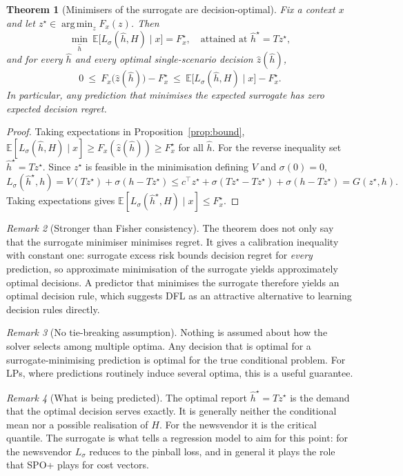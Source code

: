 \documentclass[11pt,a4paper]{article}
\newtheorem{theorem}{Theorem}
\theoremstyle{remark}
\newtheorem{remark}[theorem]{Remark}
\newcommand{\E}{\mathbb E}
\newcommand{\hh}{\hat h}
\newcommand{\Ls}{L_\sigma}
\DeclareMathOperator*{\argmin}{arg\,min}
\begin{document}
\begin{theorem}[Minimisers of the surrogate are decision-optimal]\label{thm:main}
Fix a context $x$ and let $z^\star\in\argmin_{z}F_x(z)$. Then
\[
 \min_{\hh}\ \E\bigl[\Ls(\hh,H)\mid x\bigr]=F_x^\star,
 \quad\text{attained at }\hh^\star=Tz^\star,
\]
and for every $\hh$ and every optimal single-scenario decision $\hat z(\hh)$,
\[
 0\ \le\ F_x\bigl(\hat z(\hh)\bigr)-F_x^\star\ \le\
 \E\bigl[\Ls(\hh,H)\mid x\bigr]-F_x^\star .
\]
In particular, any prediction that minimises the expected surrogate has zero
expected decision regret.
\end{theorem}

\begin{proof}
Taking expectations in Proposition~\ref{prop:bound},
$\E[\Ls(\hh,H)\mid x]\ge F_x(\hat z(\hh))\ge F_x^\star$ for all $\hh$. For the
reverse inequality set $\hh^\star=Tz^\star$. Since $z^\star$ is feasible in the
minimisation defining $V$ and $\sigma(0)=0$,
\[
 \Ls(\hh^\star,h)=V(Tz^\star)+\sigma(h-Tz^\star)
 \le c^\top z^\star+\sigma(Tz^\star-Tz^\star)+\sigma(h-Tz^\star)=G(z^\star,h).
\]
Taking expectations gives $\E[\Ls(\hh^\star,H)\mid x]\le F_x^\star$.
\end{proof}

\begin{remark}[Stronger than Fisher consistency]
The theorem does not only say that the surrogate minimiser minimises regret.
It gives a calibration inequality with constant one: surrogate excess risk
bounds decision regret for \emph{every} prediction, so approximate minimisation
of the surrogate yields approximately optimal decisions. A predictor that
minimises the surrogate therefore yields an optimal decision rule, which
suggests DFL as an attractive alternative to learning decision rules directly.
\end{remark}

\begin{remark}[No tie-breaking assumption]
Nothing is assumed about how the solver selects among multiple optima. Any
decision that is optimal for a surrogate-minimising prediction is optimal for
the true conditional problem. For LPs, where predictions routinely induce
several optima, this is a useful guarantee.
\end{remark}

\begin{remark}[What is being predicted]
The optimal report $\hh^\star=Tz^\star$ is the demand that the optimal decision
serves exactly. It is generally neither the conditional mean nor a possible
realisation of $H$. For the newsvendor it is the critical quantile. The
surrogate is what tells a regression model to aim for this point: for the
newsvendor $\Ls$ reduces to the pinball loss, and in general it plays the role
that SPO+ plays for cost vectors.
\end{remark}
\end{document}
